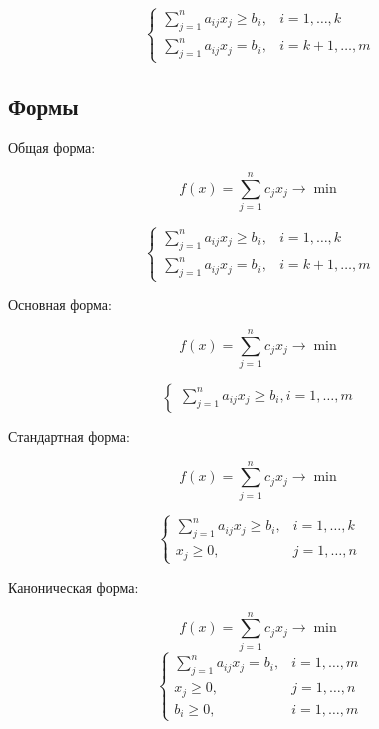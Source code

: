 \documentclass{report}
\begin{document}
\begin{equation}
	\begin{cases}	
		\sum_{j=1}^n a_{ij} x_j \geq b_i, &  i=1,\dots, k\\
		\sum_{j=1}^n a_{ij} x_j= b_i, & i=k+1,\dots,m
	\end{cases}
\end{equation}
\subsection{Формы}

Общая форма:

\begin{equation}
	f(x)=\sum_{j=1}^n c_j x_j \to \min
\end{equation}

\begin{equation}
\begin{cases}	
	\sum_{j=1}^n a_{ij} x_j \geq b_i, &  i=1,\dots, k\\
	\sum_{j=1}^n a_{ij} x_j= b_i, & i=k+1,\dots,m
\end{cases}
\end{equation}

Основная форма:

\begin{equation}
	f(x)=\sum_{j=1}^n c_j x_j \to \min
\end{equation}

\begin{equation}
	\begin{cases}	
		\sum_{j=1}^n a_{ij} x_j \geq b_i, i=1,\dots, m
	\end{cases}
\end{equation}

Стандартная форма:

\begin{equation}
	f(x)=\sum_{j=1}^n c_j x_j \to \min
\end{equation}

\begin{equation}
	\begin{cases}	
		\sum_{j=1}^n a_{ij} x_j \geq b_i, &  i=1,\dots, k\\
		x_j\geq0, & j=1,\dots,n
	\end{cases}
\end{equation}

Каноническая форма: 

\begin{equation}
	f(x)=\sum_{j=1}^n c_j x_j \to \min
\end{equation}
\begin{equation}
	\begin{cases}	
		\sum_{j=1}^n a_{ij} x_j= b_i, &i=1,\dots,m\\
		x_j\geq0, & j=1,\dots,n\\
		b_i\geq0, & i=1,\dots,m
	\end{cases}
\end{equation}
\end{document}
